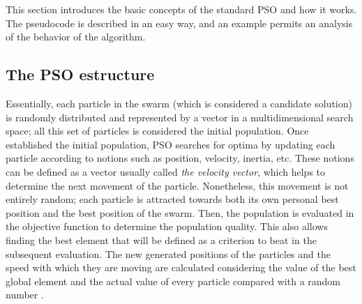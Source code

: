 This section introduces the basic concepts of the standard PSO and how it works. The pseudocode is described in an easy way, and an example permits an analysis of the behavior of the algorithm.




\subsection{The PSO estructure}

Essentially, each particle in the swarm (which is considered a candidate solution) is randomly distributed and represented by a vector in a multidimensional search space; all this set of particles is considered the initial population. Once established the initial population, PSO searches for optima by updating each particle according to notions such as position, velocity, inertia, etc. These notions can be defined as a vector usually called \textit{the velocity vector}, which helps to determine the next movement of the particle. Nonetheless, this movement is not entirely random; each particle is attracted towards both its own personal best position and the best position of the swarm. Then, the population is evaluated in the objective function to determine the population quality. This also allows finding the best element that will be defined as a criterion to beat in the subsequent evaluation. The new generated positions of the particles and the speed with which they are moving are calculated considering the value of the best global element and the actual value of every particle compared with a random number \cite{erick2021matlab}.\\

